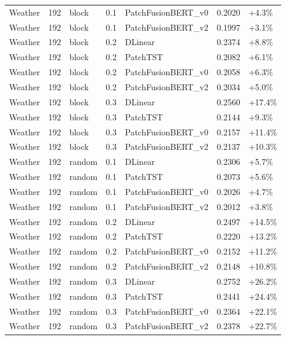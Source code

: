 \begin{tabular}{lllrlll}
Weather & 192 & block & 0.1 & PatchFusionBERT_v0 & 0.2020 & +4.3\% \\
Weather & 192 & block & 0.1 & PatchFusionBERT_v2 & 0.1997 & +3.1\% \\
Weather & 192 & block & 0.2 & DLinear & 0.2374 & +8.8\% \\
Weather & 192 & block & 0.2 & PatchTST & 0.2082 & +6.1\% \\
Weather & 192 & block & 0.2 & PatchFusionBERT_v0 & 0.2058 & +6.3\% \\
Weather & 192 & block & 0.2 & PatchFusionBERT_v2 & 0.2034 & +5.0\% \\
Weather & 192 & block & 0.3 & DLinear & 0.2560 & +17.4\% \\
Weather & 192 & block & 0.3 & PatchTST & 0.2144 & +9.3\% \\
Weather & 192 & block & 0.3 & PatchFusionBERT_v0 & 0.2157 & +11.4\% \\
Weather & 192 & block & 0.3 & PatchFusionBERT_v2 & 0.2137 & +10.3\% \\
Weather & 192 & random & 0.1 & DLinear & 0.2306 & +5.7\% \\
Weather & 192 & random & 0.1 & PatchTST & 0.2073 & +5.6\% \\
Weather & 192 & random & 0.1 & PatchFusionBERT_v0 & 0.2026 & +4.7\% \\
Weather & 192 & random & 0.1 & PatchFusionBERT_v2 & 0.2012 & +3.8\% \\
Weather & 192 & random & 0.2 & DLinear & 0.2497 & +14.5\% \\
Weather & 192 & random & 0.2 & PatchTST & 0.2220 & +13.2\% \\
Weather & 192 & random & 0.2 & PatchFusionBERT_v0 & 0.2152 & +11.2\% \\
Weather & 192 & random & 0.2 & PatchFusionBERT_v2 & 0.2148 & +10.8\% \\
Weather & 192 & random & 0.3 & DLinear & 0.2752 & +26.2\% \\
Weather & 192 & random & 0.3 & PatchTST & 0.2441 & +24.4\% \\
Weather & 192 & random & 0.3 & PatchFusionBERT_v0 & 0.2364 & +22.1\% \\
Weather & 192 & random & 0.3 & PatchFusionBERT_v2 & 0.2378 & +22.7\% \\
\bottomrule
\end{tabular}
